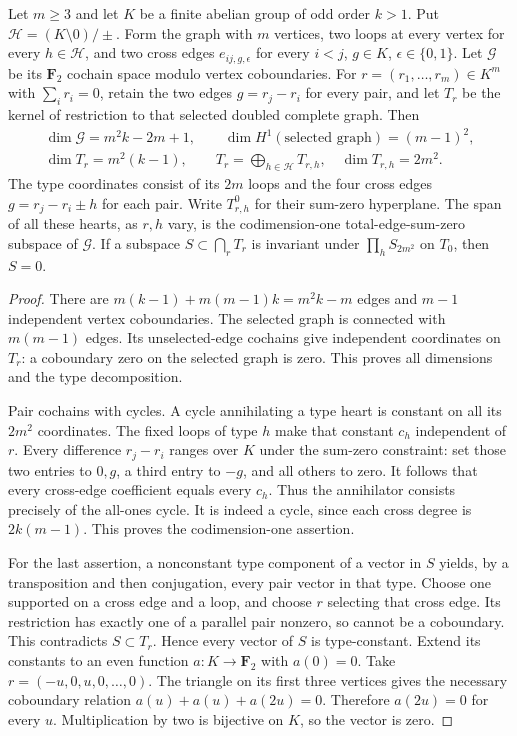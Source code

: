 \begin{lemma}
\label{lem:RD-A4-many-theta-graph}
Let $m\ge3$ and let $K$ be a finite abelian group of odd order $k>1$.
Put $\mathcal H=(K\setminus0)/\pm$.  Form the graph with $m$ vertices,
two loops at every vertex for every $h\in\mathcal H$, and two cross
edges $e_{ij,g,\epsilon}$ for every $i<j$, $g\in K$,
$\epsilon\in\{0,1\}$.  Let $\mathcal G$ be its $\mathbf F_2$
cochain space modulo vertex coboundaries.  For
$r=(r_1,\ldots,r_m)\in K^m$ with $\sum_i r_i=0$, retain the two
edges $g=r_j-r_i$ for every pair, and let $T_r$ be the kernel of
restriction to that selected doubled complete graph.  Then
\[
 \begin{gathered}
 \dim\mathcal G=m^2k-2m+1,\qquad
 \dim H^1(\text{selected graph})=(m-1)^2,\\
 \dim T_r=m^2(k-1),\qquad
 T_r=\bigoplus_{h\in\mathcal H}T_{r,h},\quad
 \dim T_{r,h}=2m^2.
 \end{gathered}                                         \tag{RD-A4-3P.1}
\]
The type coordinates consist of its $2m$ loops and the four
cross edges $g=r_j-r_i\pm h$ for each pair.  Write $T_{r,h}^0$
for their sum-zero hyperplane.
The span of all these hearts, as $r,h$ vary, is the codimension-one
total-edge-sum-zero subspace of $\mathcal G$.  If a subspace
$S\subset\bigcap_rT_r$ is invariant under
$\prod_hS_{2m^2}$ on $T_0$, then $S=0$.
\end{lemma}
\begin{proof}
There are $m(k-1)+m(m-1)k=m^2k-m$ edges and $m-1$ independent
vertex coboundaries.  The selected graph is connected with
$m(m-1)$ edges.  Its unselected-edge cochains give independent
coordinates on $T_r$: a coboundary zero on the selected graph
is zero.  This proves all dimensions and the type decomposition.

Pair cochains with cycles.  A cycle annihilating a type heart is
constant on all its $2m^2$ coordinates.  The fixed loops of type
$h$ make that constant $c_h$ independent of $r$.  Every difference
$r_j-r_i$ ranges over $K$ under the sum-zero constraint: set those
two entries to $0,g$, a third entry to $-g$, and all others to zero.
It follows that every cross-edge coefficient equals every $c_h$.
Thus the annihilator consists precisely of the all-ones cycle.
It is indeed a cycle, since each cross degree is $2k(m-1)$.
This proves the codimension-one assertion.

For the last assertion, a nonconstant type component of a vector
in $S$ yields, by a transposition and then conjugation, every pair
vector in that type.  Choose one supported on a cross edge and a
loop, and choose $r$ selecting that cross edge.  Its restriction
has exactly one of a parallel pair nonzero, so cannot be a
coboundary.  This contradicts $S\subset T_r$.
Hence every vector of $S$ is type-constant.  Extend its constants
to an even function $a:K\to\mathbf F_2$ with $a(0)=0$.
Take $r=(-u,0,u,0,\ldots,0)$.  The triangle on its first three
vertices gives the necessary coboundary relation
$a(u)+a(u)+a(2u)=0$.  Therefore $a(2u)=0$ for every $u$.
Multiplication by two is bijective on $K$, so the vector is zero.
\end{proof}

